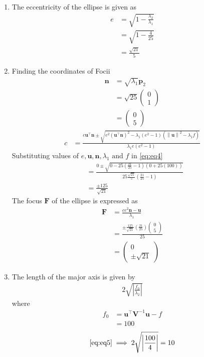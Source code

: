 \documentclass[12pt]{article}
\providecommand{\brak}[1]{\ensuremath{\left(#1\right)}}
\providecommand{\norm}[1]{\left\lVert#1\right\rVert}
\providecommand{\abs}[1]{\left\vert#1\right\vert}
\newcommand{\myvec}[1]{\ensuremath{\begin{pmatrix}#1\end{pmatrix}}}
\let\vec\mathbf
\begin{document}
\begin{enumerate}
\item The eccentricity of the ellipse is given as
\begin{align}
	e &= \sqrt{1 - \frac{\lambda_2}{\lambda_1}}\\
	  &= \sqrt{1-\frac{4}{25}}\\
	  &= \frac{\sqrt{21}}{5}
\end{align}
\item Finding the coordinates of Focii
\begin{align}
	\vec{n} &= \sqrt{\lambda_1}\vec{p}_2\\
	&= \sqrt{25} \myvec{0\\1}\\
	&= \myvec{0\\5}
\end{align}
\begin{align}
	\label{eq:eq4}
	c &= \frac{e\vec{u}^\top \vec{n} \pm \sqrt{e^2 \brak{\vec{u}^\top \vec{n}}^2-\lambda_1 \brak{e^2 -1}\brak{\norm{\vec{u}}^2-\lambda_1 f}}}{\lambda_1 e\brak{e^2-1}}
\end{align}
Substituting values of $e,\vec{u},\vec{n},\lambda_1 \text{ and } f$ in \eqref{eq:eq4}
\begin{align}
	&= \frac{0 \pm \sqrt{0-25\brak{\frac{21}{25}-1}\brak{0+25\brak{100}}}}{25\frac{\sqrt{21}}{5}\brak{\frac{21}{25}-1}}\\
	&= \frac{\pm 125}{\sqrt{21}}
\end{align}
The focus $\vec{F}$ of the ellipse is expressed as
\begin{align}
	\vec{F} &= \frac{ce^2 \vec{n}-\vec{u}}{\lambda_1}\\
	&= \frac{\pm \frac{125}{\sqrt{21}}\brak{\frac{21}{25}}\myvec{0\\5}}{25}\\
	&= \myvec{0\\\pm \sqrt{21}}
\end{align}
\item The length of the major axis is given by
\begin{align}
	\label{eq:eq5}
	2\sqrt{\abs{\frac{f_0}{\lambda_2}}}
\end{align}
where
\begin{align}
	f_0 &= \vec{u}^\top \vec{V}^{-1} \vec{u} -f\\
	    &= 100
\end{align}
\begin{align}
	\eqref{eq:eq5} \implies 2\sqrt{\abs{\frac{100}{4}}}
	 = 10
\end{align}

\end{enumerate}
\end{document}
